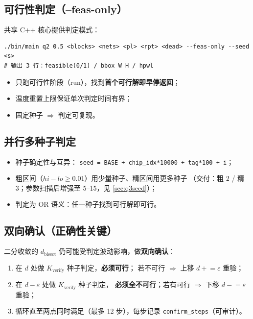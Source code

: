 \documentclass[12pt,a4paper]{article}
\begin{document}
\subsection{可行性判定（--feas-only）}

共享 C++ 核心提供判定模式：
{\footnotesize
\begin{verbatim}
./bin/main q2 0.5 <blocks> <nets> <pl> <rpt> <dead> --feas-only --seed <s>
# 输出 3 行：feasible(0/1) / bbox W H / hpwl
\end{verbatim}
}

\begin{itemize}
    \item 只跑可行性阶段（run），找到\textbf{首个可行解即早停返回}；
    \item 温度重置上限保证单次判定时间有界；
    \item 固定种子 $\Rightarrow$ 判定可复现。
\end{itemize}

\subsection{并行多种子判定}

\begin{itemize}
    \item 种子确定性与互异：
    \texttt{seed = BASE + chip\_idx*10000 + tag*100 + i}；
    \item 粗区间（$hi - lo \ge 0.01$）用少量种子、精区间用更多种子
    （交付：粗 2 / 精 3；参数扫描后增强至 5--15，见 \ref{sec:q3seed}）；
    \item 判定为 OR 语义：任一种子找到可行解即可行。
\end{itemize}

\subsection{双向确认（正确性关键）}

二分收敛的 $d_{\text{bisect}}$ 仍可能受判定波动影响，做\textbf{双向确认}：

\begin{enumerate}
    \item 在 $d$ 处做 $K_{\text{verify}}$ 种子判定，\textbf{必须可行}；
    若不可行 $\Rightarrow$ 上移 $d \mathrel{+}= \varepsilon$ 重验；
    \item 在 $d - \varepsilon$ 处做 $K_{\text{verify}}$ 种子判定，
    \textbf{必须全不可行}；若有可行 $\Rightarrow$ 下移
    $d \mathrel{-}= \varepsilon$ 重验；
    \item 循环直至两点同时满足（最多 12 步），每步记录
    \texttt{confirm\_steps}（可审计）。
\end{enumerate}
\end{document}
